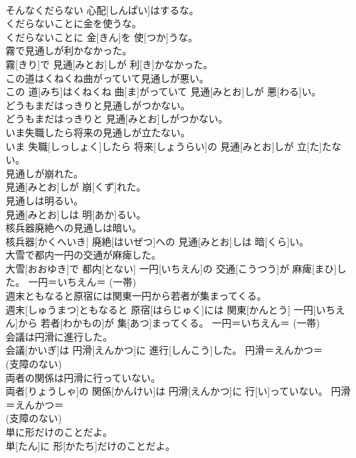 \documentclass[8pt]{extreport}
\begin{document}
\begin{CJK}{UTF8}{min}
{\\	そんなくだらない 心配[しんぱい]はするな。	
\\	くだらないことに金を使うな。	
\\	くだらないことに 金[きん]を 使[つか]うな。	
\\	霧で見通しが利かなかった。	
\\	霧[きり]で 見通[みとお]しが 利[き]かなかった。	
\\	この道はくねくね曲がっていて見通しが悪い。	
\\	この 道[みち]はくねくね 曲[ま]がっていて 見通[みとお]しが 悪[わる]い。	
\\	どうもまだはっきりと見通しがつかない。	
\\	どうもまだはっきりと 見通[みとお]しがつかない。	
\\	いま失職したら将来の見通しが立たない。	
\\	いま 失職[しっしょく]したら 将来[しょうらい]の 見通[みとお]しが 立[た]たない。	
\\	見通しが崩れた。	
\\	見通[みとお]しが 崩[くず]れた。	
\\	見通しは明るい。	
\\	見通[みとお]しは 明[あか]るい。	
\\	核兵器廃絶への見通しは暗い。	
\\	核兵器[かくへいき] 廃絶[はいぜつ]への 見通[みとお]しは 暗[くら]い。	
\\	大雪で都内一円の交通が麻痺した。	
\\	大雪[おおゆき]で 都内[とない] 一円[いちえん]の 交通[こうつう]が 麻痺[まひ]した。	一円＝いちえん＝ (一帯) 
\\	週末ともなると原宿には関東一円から若者が集まってくる。	
\\	週末[しゅうまつ]ともなると 原宿[はらじゅく]には 関東[かんとう] 一円[いちえん]から 若者[わかもの]が 集[あつ]まってくる。	一円＝いちえん＝ (一帯) 
\\	会議は円滑に進行した。	
\\	会議[かいぎ]は 円滑[えんかつ]に 進行[しんこう]した。	円滑＝えんかつ＝ 
\\	(支障のない) 
\\	両者の関係は円滑に行っていない。	
\\	両者[りょうしゃ]の 関係[かんけい]は 円滑[えんかつ]に 行[い]っていない。	円滑＝えんかつ＝ 
\\	(支障のない) 
\\	単に形だけのことだよ。	
\\	単[たん]に 形[かたち]だけのことだよ。	
}
\end{CJK}
\end{document}
